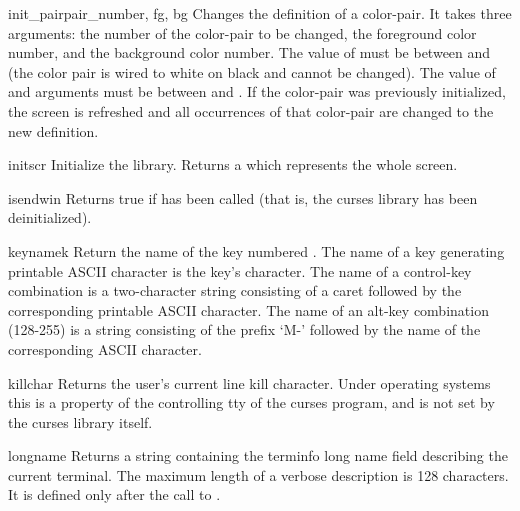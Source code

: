 \begin{funcdesc}{init_pair}{pair_number, fg, bg}
Changes the definition of a color-pair.  It takes three arguments: the
number of the color-pair to be changed, the foreground color number,
and the background color number.  The value of  must
be between  and  (the  color
pair is wired to white on black and cannot be changed).  The value of
 and  arguments must be between  and
.  If the color-pair was previously initialized, the
screen is refreshed and all occurrences of that color-pair are changed
to the new definition.
\end{funcdesc}

\begin{funcdesc}{initscr}{}
Initialize the library. Returns a  which represents
the whole screen.  
\end{funcdesc}

\begin{funcdesc}{isendwin}{}
Returns true if  has been called (that is, the 
curses library has been deinitialized).
\end{funcdesc}

\begin{funcdesc}{keyname}{k}
Return the name of the key numbered .  The name of a key
generating printable ASCII character is the key's character.  The name
of a control-key combination is a two-character string consisting of a
caret followed by the corresponding printable ASCII character.  The
name of an alt-key combination (128-255) is a string consisting of the
prefix `M-' followed by the name of the corresponding ASCII character.
\end{funcdesc}

\begin{funcdesc}{killchar}{}
Returns the user's current line kill character. Under \UNIX{} operating
systems this is a property of the controlling tty of the curses
program, and is not set by the curses library itself.
\end{funcdesc}

\begin{funcdesc}{longname}{}
Returns a string containing the terminfo long name field describing the current
terminal.  The maximum length of a verbose description is 128
characters.  It is defined only after the call to
.
\end{funcdesc}

